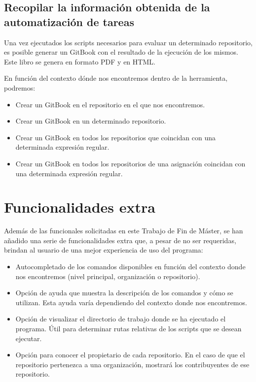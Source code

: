 \subsection{Recopilar la información obtenida de la automatización de tareas}
\label{subsec:3.1.4}

    Una vez ejecutados los scripts necesarios para evaluar un determinado repositorio, es posible generar un GitBook con el resultado de la ejecución de los mismos. Este libro se genera en formato PDF y en HTML.
\bigskip
    
    En función del contexto dónde nos encontremos dentro de la herramienta, podremos:
    \begin{itemize}
    	\item Crear un GitBook en el repositorio en el que nos encontremos.
    	\item Crear un GitBook en un determinado repositorio.
	    \item Crear un GitBook en todos los repositorios que coincidan con una determinada expresión regular.
	    \item Crear un GitBook en todos los repositorios de una asignación coincidan con una determinada expresión regular.
    \end{itemize}
		
\newpage
\section{Funcionalidades extra}
\label{3:sec:2}

Además de las funcionales solicitadas en este Trabajo de Fin de Máster, se han añadido una serie de funcionalidades extra que, a pesar de no ser requeridas, brindan al usuario de una mejor experiencia de uso del programa:

\begin{itemize}
  \item Autocompletado de los comandos disponibles en función del contexto donde nos encontremos (nivel principal, organización o repositorio).
	\item Opción de ayuda que muestra la descripción de los comandos y cómo se utilizan. Esta ayuda varía dependiendo del contexto donde nos encontremos.
	\item Opción de visualizar el directorio de trabajo donde se ha ejecutado el programa. Útil para determinar rutas relativas de los scripts que se desean ejecutar.
	\item Opción para conocer el propietario de cada repositorio. En el caso de que el repositorio pertenezca a una organización, mostrará los contribuyentes de ese repositorio.
\end{itemize}

